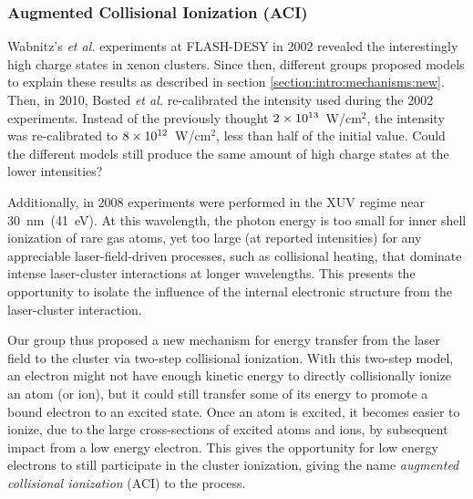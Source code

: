 \subsubsection{Augmented Collisional Ionization (ACI)}

Wabnitz's \textit{et al.} experiments at FLASH-DESY in 2002 revealed the
interestingly high charge states in xenon clusters. Since then, different groups
proposed models to explain these results as described in section
\ref{section:intro:mechanisms:new}.
Then, in 2010, Bosted \textit{et al.}
re-calibrated the intensity used during the 2002 experiments.
Instead of the previously thought $\ten{2}{13}$~W/cm$^2$, the intensity was
re-calibrated to $\ten{8}{12}$~W/cm$^2$, less than half of the initial value.
Could the different models still produce the same amount of high charge states
at the lower intensities?

Additionally, in 2008 experiments \cite{Bostedt2008,Murphy2008b} were performed
in the XUV regime near 30~nm~(41~eV). At this wavelength, the photon energy is
too small for inner shell ionization of rare gas atoms, yet too large
(at reported intensities) for any appreciable laser-field-driven processes, such
as collisional heating, that dominate intense laser-cluster interactions at
longer wavelengths. This presents the opportunity to isolate the influence of
the internal electronic structure from the laser-cluster interaction.

Our group thus proposed a new mechanism for energy transfer from the laser field
to the cluster via two-step collisional ionization. With this two-step model, an
electron might not have enough kinetic energy to directly collisionally ionize
an atom (or ion), but it could still transfer some of
its energy to promote a bound electron to an excited state. Once an atom is
excited, it becomes easier to ionize, due to the large cross-sections of excited
atoms and ions, by subsequent impact from a low energy electron. This gives the
opportunity for low energy electrons to still participate in the cluster
ionization, giving the name \textit{augmented collisional ionization} (ACI) to
the process.

